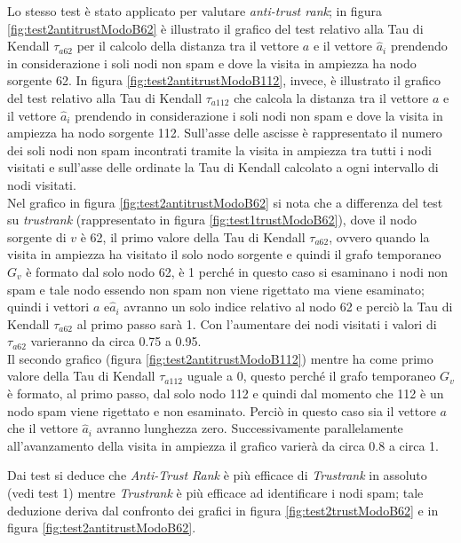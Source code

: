 Lo stesso test è stato applicato per valutare \textit{anti-trust rank}; in figura \ref{fig:test2antitrustModoB62} è illustrato il grafico del test relativo alla Tau di Kendall \(\tau_{a62}\) per il calcolo della distanza tra il vettore \(a\) e il vettore \(\hat{a}_i\) prendendo in considerazione i soli nodi non spam e dove  la visita in ampiezza ha nodo sorgente 62. In figura \ref{fig:test2antitrustModoB112}, invece, è illustrato il grafico del test relativo alla Tau di Kendall \(\tau_{a112}\) che  calcola la distanza tra il vettore \(a\) e il vettore \(\hat{a}_i\) prendendo in considerazione i soli nodi non spam e dove la visita in ampiezza ha nodo sorgente 112. Sull'asse delle ascisse è rappresentato il numero dei soli nodi non spam incontrati tramite la visita in ampiezza tra tutti i nodi visitati e sull'asse delle ordinate la Tau di Kendall calcolato a ogni intervallo di nodi visitati.\\
Nel grafico in figura \ref{fig:test2antitrustModoB62} si nota che a differenza del test su \textit{trustrank} (rappresentato in figura \ref{fig:test1trustModoB62}), dove il nodo sorgente di \(v\) è 62, il primo valore della Tau di Kendall \(\tau_{a62}\), ovvero quando la visita in ampiezza ha visitato il solo nodo sorgente e quindi il grafo temporaneo \(G_v\) è formato dal solo nodo 62, è 1 perché in questo caso si esaminano i nodi non spam e tale nodo essendo non spam non viene rigettato ma viene esaminato; quindi i vettori \(a\) e\(\hat{a}_i\) avranno un solo indice relativo al nodo 62 e perciò la Tau di Kendall \(\tau_{a62}\) al primo passo sarà 1. Con l'aumentare dei nodi visitati i valori di \(\tau_{a62}\) varieranno da circa 0.75 a 0.95. \\
Il secondo grafico (figura \ref{fig:test2antitrustModoB112}) mentre ha come primo valore della Tau di Kendall \(\tau_{a112}\) uguale a 0, questo perché il grafo temporaneo \(G_v\) è formato, al primo passo,  dal solo nodo 112 e quindi dal momento che 112 è un nodo spam viene rigettato e non esaminato. Perciò in questo caso sia il vettore \(a\) che il vettore \(\hat{a}_i\) avranno lunghezza zero. Successivamente parallelamente all'avanzamento della visita in ampiezza il grafico varierà da circa 0.8 a circa 1.

Dai test si deduce che  \textit{Anti-Trust Rank} è più efficace di \textit{Trustrank} in assoluto (vedi test 1) mentre \textit{Trustrank} è più efficace ad identificare i nodi spam; tale deduzione deriva  dal confronto dei grafici in figura \ref{fig:test2trustModoB62} e in figura \ref{fig:test2antitrustModoB62}. 

